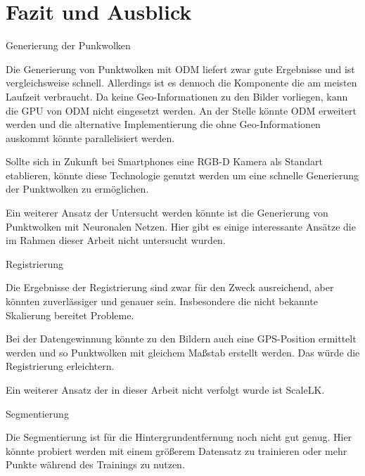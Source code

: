 \documentclass[12pt,titlepage, twoside]{article}
\begin{document}
\newpage
\section{Fazit und Ausblick}
\label{sec:fazit}
%

Generierung der Punkwolken

Die Generierung von Punktwolken mit ODM liefert zwar gute Ergebnisse und ist vergleichsweise schnell. Allerdings ist es dennoch die Komponente die am meisten Laufzeit verbraucht.
Da keine Geo-Informationen zu den Bilder vorliegen, kann die GPU von ODM nicht eingesetzt werden. An der Stelle könnte ODM erweitert werden und die alternative Implementierung die ohne Geo-Informationen auskommt könnte parallelisiert werden.

Sollte sich in Zukunft bei Smartphones eine RGB-D Kamera als Standart etablieren, könnte diese Technologie genutzt werden um eine schnelle Generierung der Punktwolken zu ermöglichen.

Ein weiterer Ansatz der Untersucht werden könnte ist die Generierung von Punktwolken mit Neuronalen Netzen. Hier gibt es einige interessante Ansätze die im Rahmen dieser Arbeit nicht untersucht wurden. 

Registrierung

Die Ergebnisse der Registrierung sind zwar für den Zweck ausreichend, aber könnten zuverlässiger und genauer sein. Insbesondere die nicht bekannte Skalierung bereitet Probleme.

Bei der Datengewinnung könnte zu den Bildern auch eine GPS-Position ermittelt werden und so Punktwolken mit gleichem Maßstab erstellt werden. Das würde die Registrierung erleichtern.

Ein weiterer Ansatz der in dieser Arbeit nicht verfolgt wurde ist ScaleLK. 

Segmentierung

Die Segmentierung ist für die Hintergrundentfernung noch nicht gut genug. Hier könnte probiert werden mit einem größerem Datensatz zu trainieren oder mehr Punkte während des Trainings zu nutzen. 
\end{document}
